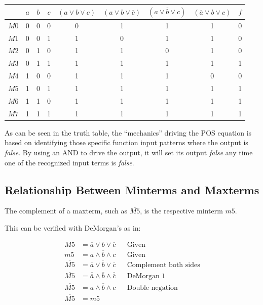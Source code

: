 \documentclass[10pt]{article}
\begin{document}
\begin{center}
\begin{tabular}{|c|ccc|cccc|c|}
     & $a$ & $b$ & $c$ & 
		$(a \lor b \lor c)$ &
		$(a \lor b \lor \overline{c})$ &
		$(a \lor \overline{b} \lor c)$ &
		$(\overline{a} \lor b \lor c)$ &
		$f$ \\
\hline
$M0$ & 0 & 0 & 0 &  0 & 1 & 1 & 1 & 0\\
$M1$ & 0 & 0 & 1 &  1 & 0 & 1 & 1 & 0\\
$M2$ & 0 & 1 & 0 &  1 & 1 & 0 & 1 & 0\\
$M3$ & 0 & 1 & 1 &  1 & 1 & 1 & 1 & 1\\
$M4$ & 1 & 0 & 0 &  1 & 1 & 1 & 0 & 0\\
$M5$ & 1 & 0 & 1 &  1 & 1 & 1 & 1 & 1\\
$M6$ & 1 & 1 & 0 &  1 & 1 & 1 & 1 & 1\\
$M7$ & 1 & 1 & 1 &  1 & 1 & 1 & 1 & 1\\
\hline
\end{tabular}
\end{center}

As can be seen in the truth table, the ``mechanics'' driving the POS equation is based
on identifying those specific function input patterns where the output is {\em false}.
By using an AND to drive the output, it will set its output {\em false} any time one 
of the recognized input terms is {\em false}.


\subsection{Relationship Between Minterms and Maxterms}

The complement of a maxterm, such as $\overline{M5}$, is the respective minterm $m5$.

This can be verified with DeMorgan's as in:

\begin{align}
M5 & = \overline{a} \lor b \lor \overline{c}	&& \text{Given}		\\
m5 & = a \land \overline{b} \land c				&& \text{Given}		\\
\overline{M5} & = \overline{\overline{a} \lor b \lor \overline{c}}	&& \text{Complement both sides} \\
\overline{M5} & = \overline{\overline{a}} \land \overline{b} \land \overline{\overline{c}}	&& \text{DeMorgan 1} \\
\overline{M5} & = a \land \overline{b} \land c				&& \text{Double negation} \\
\overline{M5} & = m5
\end{align}
\end{document}
